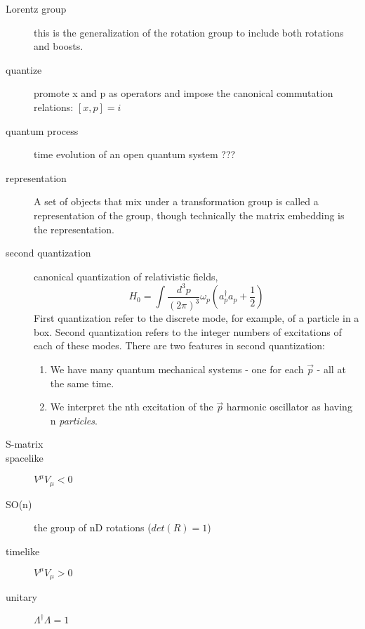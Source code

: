 \begin{description}
    \item [Lorentz group] this is the generalization of the rotation group
	to include both rotations and boosts.
    \item [quantize]	promote x and p as operators and impose the
	canonical commutation relations:    $[x, p] = i$
    \item [quantum process]  time evolution of an open quantum system ???
    \item [representation] A set of objects that mix under a transformation
	group is called a representation of the group, though technically
	the matrix embedding is the representation.
    \item [second quantization]	canonical quantization of relativistic
	fields, 
	\[
	    H_0 = \int \frac{d^{3}p}{(2\pi)^3}\omega_p(a^{\dag}_p a_p +
	\frac{1}{2})
	\] 
	First quantization refer to the discrete mode, for
	example, of a particle in a box. Second quantization refers to the
	integer numbers of excitations of each of these modes. There are two
	features in second quantization:
	\begin{enumerate}
	    \item We have many quantum mechanical systems - one for each
		$\vec{p}$ - all at the same time.
	    \item We interpret the nth excitation of the $\vec{p}$ harmonic
		oscillator as having n \emph{particles}.
	\end{enumerate}
    \item [S-matrix]
    \item [spacelike]	$V^\mu V_\mu < 0$
    \item [SO(n)] the group of nD rotations ($det(R) = 1$)
    \item [timelike]	$V^\mu V_\mu > 0$
    \item [unitary] $\Lambda^{\dag}\Lambda = 1$
\end{description}
